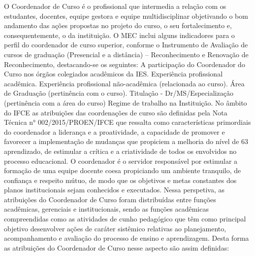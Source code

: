 O Coordenador de Curso é o profissional que intermedia a relação com os estudantes, docentes, equipe gestora e equipe multidisciplinar objetivando o bom andamento das ações propostas no projeto do curso, o seu fortalecimento e, consequentemente, o da instituição. O MEC inclui alguns indicadores para o perfil do coordenador de curso superior, conforme o Instrumento de Avaliação de cursos de graduação (Presencial e a distância) – Reconhecimento e Renovação de Reconhecimento, destacando-se os seguintes: A participação do Coordenador do Curso nos órgãos colegiados acadêmicos da IES. Experiência profissional acadêmica. Experiência profissional não-acadêmica (relacionada ao curso). Área de Graduação (pertinência com o curso). Titulação - Dr/MS/Especialização (pertinência com a área do curso) Regime de trabalho na Instituição. No âmbito do IFCE as atribuições das coordenações de curso são definidas pela Nota Técnica n° 002/2015/PROEN/IFCE que ressalta como características primordiais do coordenador a liderança e a proatividade, a capacidade de promover e favorecer a implementação de mudanças que propiciem a melhoria do nível de 63 aprendizado, de estimular a crítica e a criatividade de todos os envolvidos no processo educacional. O coordenador é o servidor responsável por estimular a formação de uma equipe docente coesa propiciando um ambiente tranquilo, de confiança e respeito mútuo, de modo que os objetivos e metas constantes dos planos institucionais sejam conhecidos e executados. Nessa perspetiva, as atribuições do Coordenador de Curso foram distribuídas entre funções acadêmicas, gerenciais e institucionais, sendo as funções acadêmicas compreendidas como as atividades de cunho pedagógico que têm como principal objetivo desenvolver ações de caráter sistêmico relativas ao planejamento, acompanhamento e avaliação do processo de ensino e aprendizagem. Desta forma as atribuições do Coordenador de Curso nesse aspecto são assim definidas:

